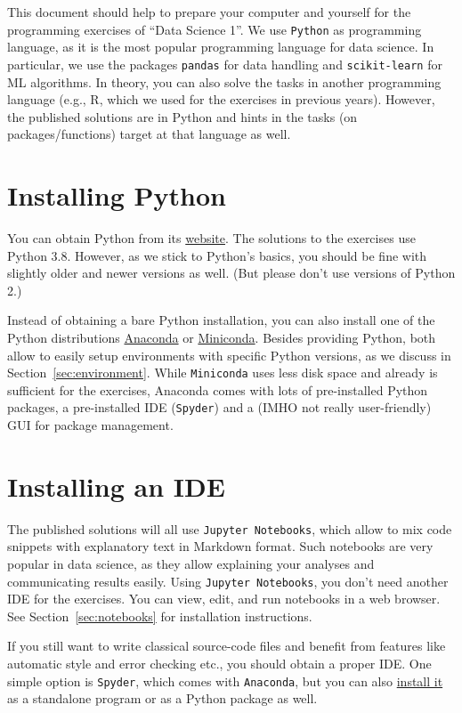 \documentclass[12pt]{article}
\newcommand{\code}[1]{\textcolor{kitgreen}{\texttt{#1}}}
\begin{document}
\noindent
This document should help to prepare your computer and yourself for the programming exercises of ``Data Science 1''.
We use \code{Python} as programming language, as it is the most popular programming language for data science.
In particular, we use the packages \code{pandas} for data handling and \code{scikit-learn} for ML algorithms.
In theory, you can also solve the tasks in another programming language (e.g., R, which we used for the exercises in previous years).
However, the published solutions are in Python and hints in the tasks (on packages/functions) target at that language as well.

\section{Installing Python}

You can obtain Python from its \href{https://www.python.org/downloads/}{website}.
The solutions to the exercises use Python 3.8.
However, as we stick to Python's basics, you should be fine with slightly older and newer versions as well.
(But please don't use versions of Python 2.)

Instead of obtaining a bare Python installation, you can also install one of the Python distributions \href{https://www.anaconda.com/products/individual}{Anaconda} or \href{https://docs.conda.io/en/latest/miniconda.html}{Miniconda}.
Besides providing Python, both allow to easily setup environments with specific Python versions, as we discuss in Section~\ref{sec:environment}.
While \code{Miniconda} uses less disk space and already is sufficient for the exercises, Anaconda comes with lots of pre-installed Python packages, a pre-installed IDE (\code{Spyder}) and a (IMHO not really user-friendly) GUI for package management.

\section{Installing an IDE}

The published solutions will all use \code{Jupyter Notebooks}, which allow to mix code snippets with explanatory text in Markdown format.
Such notebooks are very popular in data science, as they allow explaining your analyses and communicating results easily.
Using \code{Jupyter Notebooks}, you don't need another IDE for the exercises.
You can view, edit, and run notebooks in a web browser.
See Section~\ref{sec:notebooks} for installation instructions.

If you still want to write classical source-code files and benefit from features like automatic style and error checking etc., you should obtain a proper IDE.
One simple option is \code{Spyder}, which comes with \code{Anaconda}, but you can also \href{https://docs.spyder-ide.org/current/installation.html}{install it} as a standalone program or as a Python package as well.
\end{document}
